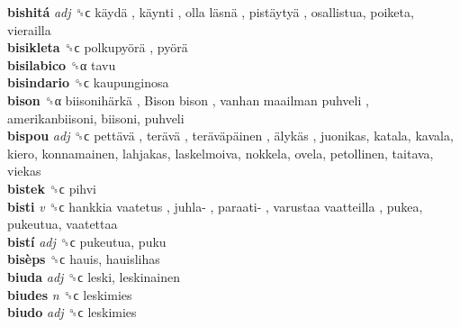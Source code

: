 \textbf{bishitá} \emph{adj}  ␝ϲ   käydä ,  käynti ,  olla läsnä ,  pistäytyä , osallistua, poiketa, vierailla  \\
\textbf{bisikleta} ␝ϲ   polkupyörä ,  pyörä   \\
\textbf{bisilabico} ␝α  tavu  \\
\textbf{bisindario} ␝ϲ  kaupunginosa  \\
\textbf{bison} ␝α   biisonihärkä ,  Bison bison ,  vanhan  maailman  puhveli , amerikanbiisoni, biisoni, puhveli  \\
\textbf{bispou} \emph{adj}  ␝ϲ   pettävä ,  terävä ,  teräväpäinen ,  älykäs , juonikas, katala, kavala, kiero, konnamainen, lahjakas, laskelmoiva, nokkela, ovela, petollinen, taitava, viekas  \\
\textbf{bistek} ␝ϲ  pihvi  \\
\textbf{bisti} \emph{v}  ␝ϲ   hankkia vaatetus ,  juhla- ,  paraati- ,  varustaa vaatteilla , pukea, pukeutua, vaatettaa  \\
\textbf{bistí} \emph{adj}  ␝ϲ  pukeutua, puku  \\
\textbf{bisèps} ␝ϲ  hauis, hauislihas  \\
\textbf{biuda} \emph{adj}  ␝ϲ  leski, leskinainen  \\
\textbf{biudes} \emph{n}  ␝ϲ  leskimies  \\
\textbf{biudo} \emph{adj}  ␝ϲ  leskimies  \\
